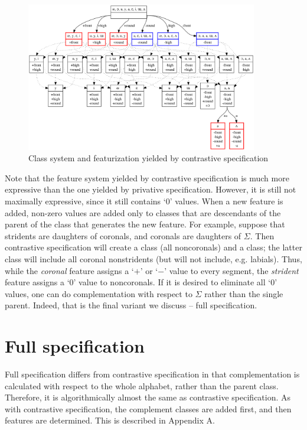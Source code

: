 \documentclass[11pt, oneside]{article}   	%
\begin{document}
\begin{figure}[h]
\includegraphics[width=0.9\textwidth]{vowelHarmony_contrastive.png}
\caption{Class system and featurization yielded by contrastive specification}
\label{fig:contrastive}
\end{figure}

\noindent Note that the feature system yielded by contrastive specification is much more expressive than the one yielded by privative specification. However, it is still not maximally expressive, since it still contains `$0$' values. When a new feature is added, non-zero values are added only to classes that are descendants of the parent of the class that generates the new feature. For example, suppose that stridents are daughters of coronals, and coronals are daughters of $\Sigma$. Then contrastive specification will create a  class (all noncoronals) and a  class; the latter class will include all coronal nonstridents (but will not include, e.g. labials). Thus, while the \textit{coronal} feature assigns a `$+$' or `$-$' value to every segment, the \textit{strident} feature assigns a `$0$' value to noncoronals. If it is desired to eliminate all `$0$' values, one can do complementation with respect to $\Sigma$ rather than the single parent. Indeed, that is the final variant we discuss -- full specification.

\section{Full specification}

Full specification differs from contrastive specification in that complementation is calculated with respect to the whole alphabet, rather than the parent class. Therefore, it is algorithmically almost the same as contrastive specification. As with contrastive specification, the complement classes are added first, and then features are determined. This is described in Appendix A.
\end{document}
